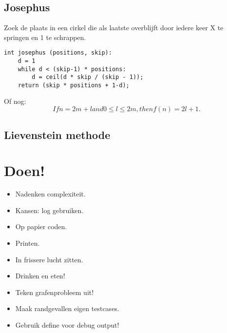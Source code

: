 \documentclass[a4paper,10pt,oneside]{report}
\begin{document}
\section{Josephus}
Zoek de plaats in een cirkel die als laatste overblijft door iedere
keer X te springen en 1 te schrappen.
\begin{verbatim}
int josephus (positions, skip):
	d = 1
    while d < (skip-1) * positions:
        d = ceil(d * skip / (skip - 1));
    return (skip * positions + 1-d);
\end{verbatim}

Of nog:
\begin{equation}
If n = 2m + l and 0 ≤ l ≤ 2m , then f(n) = 2l + 1.
\end{equation}

\section{Lievenstein methode}
\chapter{Doen!}

\begin{itemize}
\item Nadenken complexiteit.
\item Kansen: log gebruiken.
\item Op papier coden.
\item Printen.
\item In frissere lucht zitten.
\item Drinken en eten!
\item Teken grafenprobleem uit!
\item Maak randgevallen eigen testcases.
\item Gebruik define voor debug output!
\end{itemize}
\end{document}
